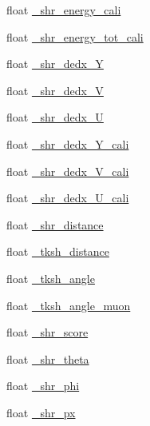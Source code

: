 \begin{DoxyCompactItemize}
\item 
float \hyperlink{classselection_1_1CC0piNpSelection_a910f18dc66ac2f22aa8cbdd6b86c7d0e}{\+\_\+shr\+\_\+energy\+\_\+cali}
\item 
float \hyperlink{classselection_1_1CC0piNpSelection_aae69f88600d31bb3456808268fb63c1c}{\+\_\+shr\+\_\+energy\+\_\+tot\+\_\+cali}
\item 
float \hyperlink{classselection_1_1CC0piNpSelection_a1af96c31bd3afe4b111f429927bbff1c}{\+\_\+shr\+\_\+dedx\+\_\+Y}
\item 
float \hyperlink{classselection_1_1CC0piNpSelection_a392211f6d023d92bf113c20098c5e7fe}{\+\_\+shr\+\_\+dedx\+\_\+V}
\item 
float \hyperlink{classselection_1_1CC0piNpSelection_ada2f72c2f814e7d06c24a50ff5ad4fcc}{\+\_\+shr\+\_\+dedx\+\_\+U}
\item 
float \hyperlink{classselection_1_1CC0piNpSelection_a114f4276a8931d33d8f77fede58398fa}{\+\_\+shr\+\_\+dedx\+\_\+\+Y\+\_\+cali}
\item 
float \hyperlink{classselection_1_1CC0piNpSelection_a0ef852fb0ecd8a3b6f871ed765be12da}{\+\_\+shr\+\_\+dedx\+\_\+\+V\+\_\+cali}
\item 
float \hyperlink{classselection_1_1CC0piNpSelection_a7c90820db5398c179aef3186ab11e521}{\+\_\+shr\+\_\+dedx\+\_\+\+U\+\_\+cali}
\item 
float \hyperlink{classselection_1_1CC0piNpSelection_a20705dc212e16009a0ce4ace27d54af7}{\+\_\+shr\+\_\+distance}
\item 
float \hyperlink{classselection_1_1CC0piNpSelection_a73d772bb569336b56a3f14cee752e2f3}{\+\_\+tksh\+\_\+distance}
\item 
float \hyperlink{classselection_1_1CC0piNpSelection_a959adc6093ff4d2730dac8f75dd1245c}{\+\_\+tksh\+\_\+angle}
\item 
float \hyperlink{classselection_1_1CC0piNpSelection_a8210028b7144d3dc078201257a1a8663}{\+\_\+tksh\+\_\+angle\+\_\+muon}
\item 
float \hyperlink{classselection_1_1CC0piNpSelection_a9033ad097ef1b7a4e10b2b872b82f068}{\+\_\+shr\+\_\+score}
\item 
float \hyperlink{classselection_1_1CC0piNpSelection_a624a38f7c8d33320df92e610fd0e16ee}{\+\_\+shr\+\_\+theta}
\item 
float \hyperlink{classselection_1_1CC0piNpSelection_a8706a83b3dc2e2c3857ada556392f16f}{\+\_\+shr\+\_\+phi}
\item 
float \hyperlink{classselection_1_1CC0piNpSelection_a52e2043c82f5de7f93ac9bad63563f18}{\+\_\+shr\+\_\+px}

\end{DoxyCompactItemize}
